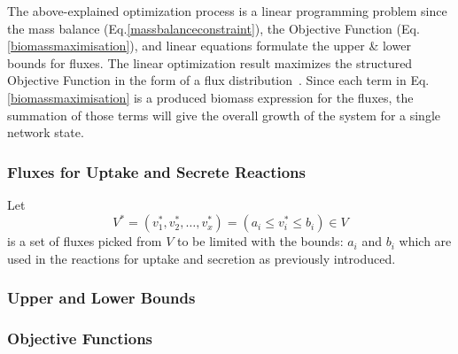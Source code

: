 

The above-explained optimization process is a linear programming problem since the mass balance (Eq.\eqref{massbalanceconstraint}), the Objective Function (Eq.\eqref{biomassmaximisation}), and linear equations formulate the upper \& lower bounds for fluxes. The linear optimization result maximizes the structured Objective Function in the form of a flux distribution~\cite{KAUFFMAN2003491,PRICE2004}. Since each term in Eq.\eqref{biomassmaximisation} is a produced biomass expression for the fluxes, the summation of those terms will give the overall growth of the system for a single network state.

\subsubsection*{Fluxes for Uptake and Secrete Reactions}
%
Let
\begin{equation} \tag{7}
	V^{*}=(v^{*}_{1}, v^{*}_{2},\dots, v^{*}_{x})= (a_{i}\le v^{*}_{i}\le b_{i})\in V
	\label{constrainedfluxlist}
\end{equation}
is a set of fluxes picked from $V$ to be limited with the bounds: $a_{i}$ and $b_{i}$ which are used in the reactions for uptake and secretion as previously introduced.
\subsubsection*{Upper and Lower Bounds}
%
\subsubsection*{Objective Functions}
%